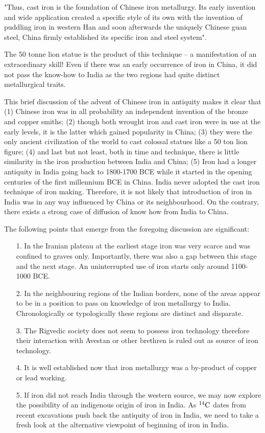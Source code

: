 {\footnotesize "Thus, cast iron is the foundation of Chinese iron metallurgy. Its early invention and wide application created a specific style of its own with the invention of puddling iron in western Han and soon afterwards the uniquely Chinese guan steel, China firmly established its specific iron and steel system".}

The 50 tonne lion statue is the product of this technique – a manifestation of an extraordinary skill! Even if there was an early occurrence of iron in China, it did not pass the know-how to India as the two regions had quite distinct metallurgical traits.

This brief discussion of the advent of Chinese iron in antiquity makes it clear that (1) Chinese iron was in all probability an independent invention of the bronze and copper smiths; (2) though both wrought iron and cast iron were in use at the early levels, it is the latter which gained popularity in China; (3) they were the only ancient civilization of the world to cast colossal statues like a 50 ton lion figure; (4) and last but not least, both in time and technique, there is little similarity in the iron production between India and China; (5) Iron had a longer antiquity in India going back to 1800-1700 BCE while it started in the opening centuries of the first millennium BCE in China. India never adopted the cast iron technique of iron making. Therefore, it is not likely that introduction of iron in India was in any way influenced by China or its neighbourhood. On the contrary, there exists a strong case of diffusion of know how from India to China. 

The following points that emerge from the foregoing discussion are significant:
\begin{itemize}
\item[1.]In the Iranian plateau at the earliest stage iron was very scarce and was confined to graves only. Importantly, there was also a gap between this stage and the next stage. An uninterrupted use of iron starts only around 1100-1000 BCE.

\item[2.] In the neighbouring regions of the Indian borders, none of the areas appear to be in a position to pass on knowledge of iron metallurgy to India. Chronologically or typologically these regions are distinct and disparate.

\item[3.] The Rigvedic society does not seem to possess iron technology therefore their interaction with Avestan or other brethren is ruled out as source of iron technology.

\item[4.] It is well established now that iron metallurgy was a by-product of copper or lead working. 

\item[5.] If iron did not reach India through the western source, we may now explore the possibility of an indigenous origin of iron in India. As $^{14}{\rm C}$ dates from recent excavations push back the antiquity of iron in India, we need to take a fresh look at the alternative viewpoint of beginning of iron in India.
\end{itemize}


